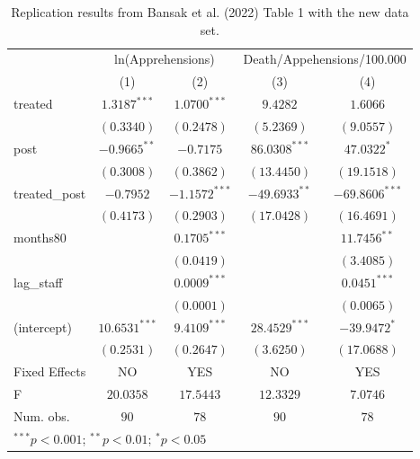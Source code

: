 
\begin{table}
\caption{Replication results from Bansak et al. (2022) Table 1 with the new data set.}
\begin{center}
\begin{tabular}{l c c c c}
\hline
 & \multicolumn{2}{c}{ln(Apprehensions)} & \multicolumn{2}{c}{Death/Appehensions/100.000} \\
\cline{2-3} \cline{4-5}
 & (1) & (2) & (3) & (4) \\
\hline
treated       & $1.3187^{***}$  & $1.0700^{***}$  & $9.4282$        & $1.6066$         \\
              & $(0.3340)$      & $(0.2478)$      & $(5.2369)$      & $(9.0557)$       \\
post          & $-0.9665^{**}$  & $-0.7175$       & $86.0308^{***}$ & $47.0322^{*}$    \\
              & $(0.3008)$      & $(0.3862)$      & $(13.4450)$     & $(19.1518)$      \\
treated\_post & $-0.7952$       & $-1.1572^{***}$ & $-49.6933^{**}$ & $-69.8606^{***}$ \\
              & $(0.4173)$      & $(0.2903)$      & $(17.0428)$     & $(16.4691)$      \\
months80      &                 & $0.1705^{***}$  &                 & $11.7456^{**}$   \\
              &                 & $(0.0419)$      &                 & $(3.4085)$       \\
lag\_staff    &                 & $0.0009^{***}$  &                 & $0.0451^{***}$   \\
              &                 & $(0.0001)$      &                 & $(0.0065)$       \\
(intercept)   & $10.6531^{***}$ & $9.4109^{***}$  & $28.4529^{***}$ & $-39.9472^{*}$   \\
              & $(0.2531)$      & $(0.2647)$      & $(3.6250)$      & $(17.0688)$      \\
\hline
Fixed Effects & NO              & YES             & NO              & YES              \\
F             & $20.0358$       & $17.5443$       & $12.3329$       & $7.0746$         \\
Num. obs.     & $90$            & $78$            & $90$            & $78$             \\
\hline
\multicolumn{5}{l}{\scriptsize{$^{***}p<0.001$; $^{**}p<0.01$; $^{*}p<0.05$}}
\end{tabular}
\label{tab:table1_new}
\end{center}
\end{table}
